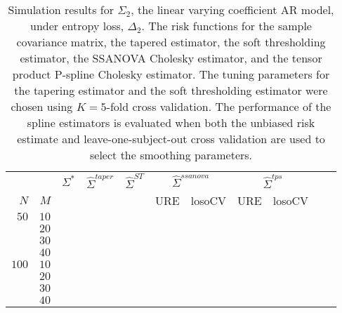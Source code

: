 \documentclass[12pt]{article}
\newcommand{\ra}[1]{\renewcommand{\arraystretch}{#1}}
\theoremstyle{definition}
\begin{document}
\begin{table}\centering
\ra{1.3}
\caption{Simulation results for $\Sigma_2$, the linear varying coefficient AR model, under entropy loss, $\Delta_2$. The risk functions for the sample covariance matrix, the tapered estimator, the soft thresholding estimator, the SSANOVA Cholesky estimator, and the tensor product P-spline Cholesky estimator. The tuning parameters for the tapering estimator and the soft thresholding estimator were chosen using $K = 5$-fold cross validation. The performance of the spline estimators is evaluated when both the unbiased risk estimate and leave-one-subject-out cross validation are used to select the smoothing parameters.}
\begin{tabular}{@{}rrrcrcrrcrr@{}}\toprule
   &            & \multicolumn{1}{c}{$\Sigma^*$}  & \multicolumn{1}{c}{$\hat{\Sigma}^{taper}$} &\multicolumn{1}{c}{$\hat{\Sigma}^{ST}$} &\multicolumn{2}{c}{ $\hat{\Sigma}^{ssanova}$} &  \multicolumn{2}{c}{ $\hat{\Sigma}^{tps}$}\\
$N$ & $M$ 	&	  &	& & \multicolumn{1}{c}{\mbox{URE}} & \multicolumn{1}{c}{\mbox{losoCV}} &\multicolumn{1}{c}{\mbox{URE}} & \multicolumn{1}{c}{\mbox{losoCV}}\\ \midrule
$50$ & $10$\\
  & $20$  &&&&&&&\\
  & $30$   &&&&&&&\\
& $40$   &&&&&&&\\ 
$100$ & $10$ &&&&&&&\\
& $20$  &&&&&&& \\
& $30$  &&&&&&& \\
& $40$  &&&&&&& \\ 
\bottomrule
\end{tabular}
\end{table}

\end{document}
